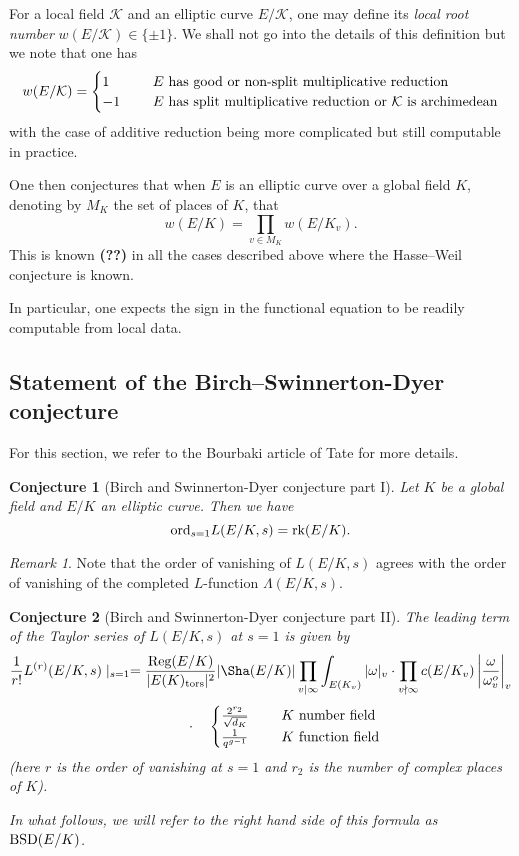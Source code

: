 \documentclass[12pt]{amsart}
\numberwithin{equation}{section}
\newtheorem{conjecture}{Conjecture}
\theoremstyle{remark}
\newtheorem{remark}[equation]{Remark}
\theoremstyle{definition}
\theoremstyle{definition}
\theoremstyle{definition}
\theoremstyle{definition}
\theoremstyle{definition}
\theoremstyle{definition}
\theoremstyle{definition}
\begin{document}
For a local field $\mathcal{K}$ and an elliptic curve $E/\mathcal{K}$, one may define its \textit{local root number} $w(E/\mathcal{K})\in \{\pm 1\}$. We shall not go into the details of this definition but we note that one has
\[w(E/\mathcal{K})=\begin{cases} 1~~&~~E \textup{ has good or non-split multiplicative reduction}\\-1 ~~&~~E \textup{ has split multiplicative reduction or } \mathcal{K} \textup{ is archimedean}\end{cases}\]
with the case of additive reduction being more complicated but still computable in practice.  

One then conjectures that when $E$ is an elliptic curve over a global field $K$, denoting by $M_K$ the set of places of $K$, that
\[w(E/K)=\prod_{v\in M_K}w(E/K_v).\]
This is known \textbf{(??)} in all the cases described above where the Hasse--Weil conjecture is known. 

In particular, one expects the sign in the functional equation to be readily computable from local data. 

 \subsection{Statement of the Birch--Swinnerton-Dyer conjecture}
 
 For this section, we refer to the Bourbaki article of Tate \cite{MR1610977} for more details. 
 
 \begin{conjecture}[Birch and Swinnerton-Dyer conjecture part I]
 Let $K$ be a global field and $E/K$ an elliptic curve. Then we have
 \[\textup{ord}_{s=1}L(E/K,s)=\textup{rk}(E/K).\]
 \end{conjecture}
 
 \begin{remark} 
 Note that the order of vanishing of $L(E/K,s)$ agrees with the order of vanishing of the completed $L$-function $\Lambda(E/K,s)$. 
 \end{remark}
 
 \begin{conjecture}[Birch and Swinnerton-Dyer conjecture part II]
 The leading term of the Taylor series of $L(E/K,s)$ at $s=1$ is given by
 \[\frac{1}{r!}L^{(r)}(E/K,s)\mid_{s=1}=\frac{\textup{Reg}(E/K)}{|E(K)_\textup{tors}|^2}|\Sha(E/K)|\prod_{v\mid \infty}\int_{E(K_v)}|\omega|_v\cdot \prod_{v \nmid \infty}c(E/K_v) \left|\frac{\omega}{\omega_{v}^o}\right|_v\]
 \[~~~\phantom{hello}\cdot ~~~\begin{cases}\frac{2^{r_2}}{\sqrt{d_K}}~~&~~K~\textup{number field}\\ \frac{1}{q^{g-1}}~~&~~K\textup{ function field}\end{cases}\]
 (here $r$ is the order of vanishing at $s=1$ and $r_2$ is the number of complex places of $K$).
 
 In what follows, we will refer to the right hand side of this formula as $\textup{BSD}(E/K)$. 
 \end{conjecture}
 
\end{document}
